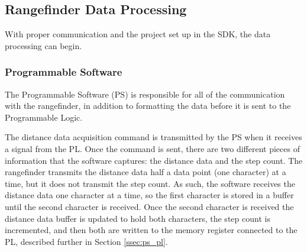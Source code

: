 \subsection{Rangefinder Data Processing}
With proper communication and the project set up in the SDK, the data processing can begin.

\subsubsection{Programmable Software}
The Programmable Software (PS) is responsible for all of the communication with the rangefinder, in addition to formatting the data before it is sent to the Programmable Logic.
\par
The distance data acquisition command is transmitted by the PS when it receives a signal from the PL. Once the command is sent, there are two different pieces of information that the software captures: the distance data and the step count. The rangefinder transmits the distance data half a data point (one character) at a time, but it does not transmit the step count. As such, the software receives the distance data one character at a time, so the first character is stored in a buffer until the second character is received. Once the second character is received the distance data buffer is updated to hold both characters, the step count is incremented, and then both are written to the memory register connected to the PL, described further in Section \ref{ssec:ps_pl}.

